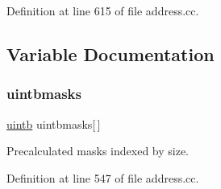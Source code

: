 Definition at line 615 of file address.\+cc.



\subsection{Variable Documentation}
\mbox{\label{address_8hh_af65db839ac7c389dab6cba2187c2e867}} 
\subsubsection{\texorpdfstring{uintbmasks}{uintbmasks}}
{\footnotesize\ttfamily \mbox{\hyperlink{types_8h_a2db313c5d32a12b01d26ac9b3bca178f}{uintb}} uintbmasks\mbox{[}$\,$\mbox{]}}



Precalculated masks indexed by size. 



Definition at line 547 of file address.\+cc.

